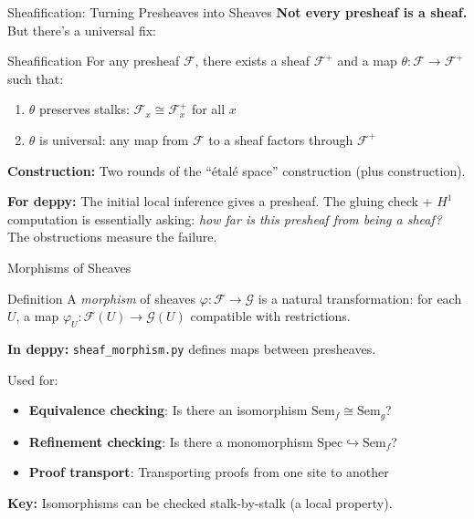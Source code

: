 \documentclass[aspectratio=169,10pt]{beamer}
\newcommand{\Fscr}{\mathcal{F}}
\newcommand{\Gscr}{\mathcal{G}}
\newcommand{\Sem}{\mathrm{Sem}}
\begin{document}
\begin{frame}{Sheafification: Turning Presheaves into Sheaves}
\textbf{Not every presheaf is a sheaf.} But there's a universal fix:

\begin{block}{Sheafification}
For any presheaf $\Fscr$, there exists a sheaf $\Fscr^+$ and a map $\theta : \Fscr \to \Fscr^+$ such that:
\begin{enumerate}
  \item $\theta$ preserves stalks: $\Fscr_x \cong \Fscr^+_x$ for all $x$
  \item $\theta$ is universal: any map from $\Fscr$ to a sheaf factors through $\Fscr^+$
\end{enumerate}
\end{block}

\textbf{Construction:} Two rounds of the ``\'etal\'e space'' construction (plus construction).

\vspace{0.3em}
\textbf{For deppy:} The initial local inference gives a presheaf. The gluing check + $H^1$ computation is essentially asking: \emph{how far is this presheaf from being a sheaf?} The obstructions measure the failure.
\end{frame}

\begin{frame}{Morphisms of Sheaves}
\begin{block}{Definition}
A \emph{morphism} of sheaves $\varphi : \Fscr \to \Gscr$ is a natural transformation: for each $U$, a map $\varphi_U : \Fscr(U) \to \Gscr(U)$ compatible with restrictions.
\end{block}

\vspace{0.3em}
\textbf{In deppy:} \texttt{sheaf\_morphism.py} defines maps between presheaves.

Used for:
\begin{itemize}
  \item \textbf{Equivalence checking}: Is there an isomorphism $\Sem_f \cong \Sem_g$?
  \item \textbf{Refinement checking}: Is there a monomorphism $\text{Spec} \hookrightarrow \Sem_f$?
  \item \textbf{Proof transport}: Transporting proofs from one site to another
\end{itemize}

\textbf{Key:} Isomorphisms can be checked stalk-by-stalk (a local property).
\end{frame}
\end{document}
